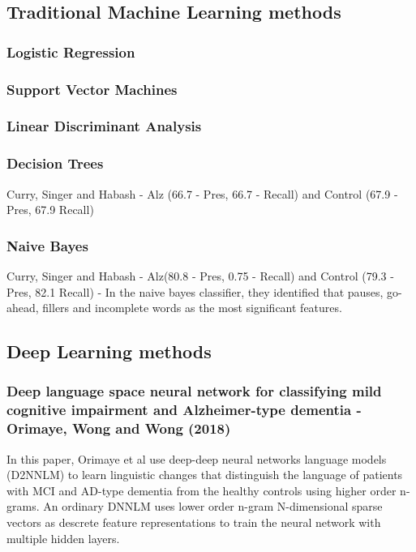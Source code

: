 \documentclass[12pt]{article}
\begin{document}
\subsection{Traditional Machine Learning methods}
\subsubsection{Logistic Regression}

\subsubsection{Support Vector Machines}

\subsubsection{Linear Discriminant Analysis}

\subsubsection{Decision Trees}

Curry, Singer and Habash - Alz (66.7 - Pres, 66.7 - Recall) and Control (67.9 - Pres, 67.9 Recall)

\subsubsection{Naive Bayes}

Curry, Singer and Habash - Alz(80.8 - Pres, 0.75 - Recall) and Control (79.3 - Pres, 82.1 Recall) - In the naive bayes classifier, they identified that pauses, go-ahead, fillers and incomplete words as the most significant features.  %

\subsection{Deep Learning methods}
\subsubsection{Deep language space neural network for classifying mild cognitive impairment and Alzheimer-type dementia - Orimaye, Wong and Wong (2018)}
In this paper, Orimaye et al use deep-deep neural networks language models (D2NNLM) to learn linguistic changes that distinguish the language of patients with MCI and AD-type dementia from the healthy controls using higher order n-grams. An ordinary DNNLM uses lower order n-gram N-dimensional sparse vectors as descrete feature representations to train the neural network with multiple hidden layers.
\end{document}
